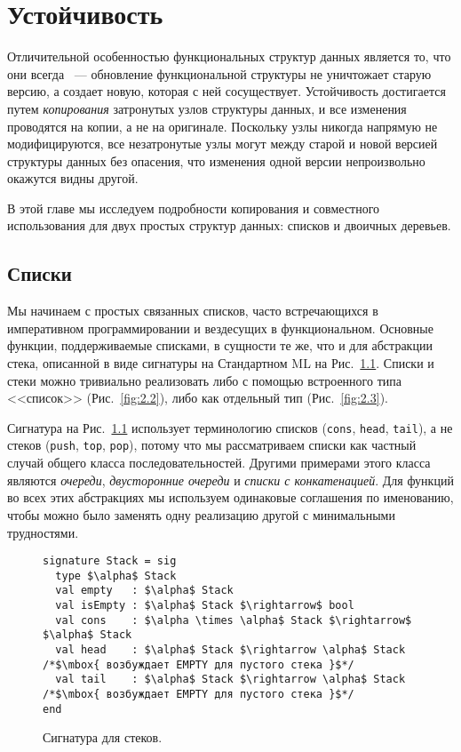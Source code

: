 \chapter{Устойчивость}
\label{ch:2}

Отличительной особенностью функциональных структур данных является то,
что они всегда ~--- обновление
функциональной структуры не уничтожает старую версию, а создает
новую, которая с ней сосуществует. Устойчивость достигается путем
\emph{копирования} затронутых узлов структуры данных, и все изменения
проводятся на копии, а не на оригинале. Поскольку узлы никогда
напрямую не модифицируются, все незатронутые узлы могут
 между старой и новой версией структуры
данных без опасения, что изменения одной версии непроизвольно окажутся
видны другой.

В этой главе мы исследуем подробности копирования и совместного использования для
двух простых структур данных: списков и двоичных деревьев.

\section{Списки}
\label{sc:2.1}

Мы начинаем с простых связанных списков, часто встречающихся в
императивном программировании и вездесущих в функциональном.  Основные
функции, поддерживаемые списками, в сущности те же, что и для
абстракции стека, описанной в виде сигнатуры на Стандартном ML на
Рис.~\ref{fig:2.1}.  Списки и стеки можно тривиально реализовать либо
с помощью встроенного типа <<список>> (Рис.~\ref{fig:2.2}), либо как
отдельный тип (Рис.~\ref{fig:2.3}).

\begin{remark}
Сигнатура на Рис.~\ref{fig:2.1} использует терминологию списков
(\texttt{cons}, \texttt{head}, \texttt{tail}), а не стеков
(\texttt{push}, \texttt{top}, \texttt{pop}), потому что мы
рассматриваем списки как частный случай общего класса
последовательностей. Другими примерами этого класса являются
\emph{очереди}, \emph{двусторонние очереди} и \emph{списки с
  конкатенацией}. Для функций во всех этих абстракциях мы используем
одинаковые соглашения по именованию, чтобы можно было заменять одну
реализацию другой с минимальными трудностями.
\end{remark}

\begin{figure}
\begin{lstlisting}
signature Stack = sig
  type $\alpha$ Stack
  val empty   : $\alpha$ Stack
  val isEmpty : $\alpha$ Stack $\rightarrow$ bool
  val cons    : $\alpha \times \alpha$ Stack $\rightarrow$ $\alpha$ Stack
  val head    : $\alpha$ Stack $\rightarrow \alpha$ Stack /*$\mbox{ возбуждает EMPTY для пустого стека }$*/
  val tail    : $\alpha$ Stack $\rightarrow \alpha$ Stack /*$\mbox{ возбуждает EMPTY для пустого стека }$*/
end
\end{lstlisting}

\caption{Сигнатура для стеков.}  \label{fig:2.1}
\end{figure}


